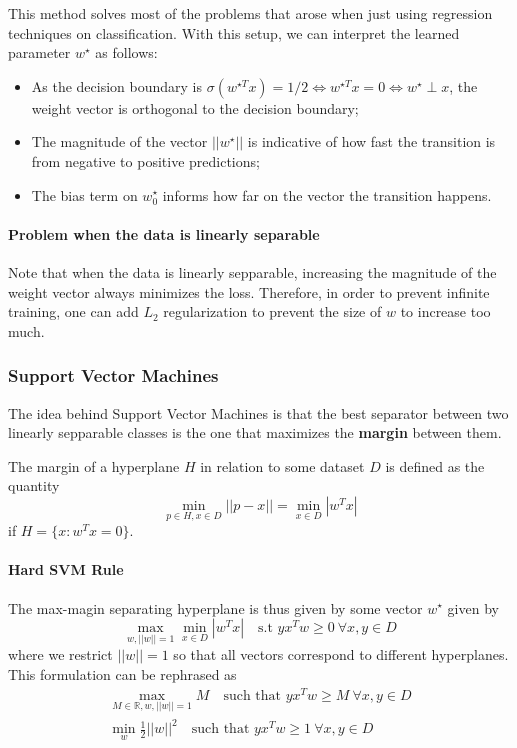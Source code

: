 \documentclass{article}
\newcommand{\R}{\mathbb{R}}
\begin{document}
This method solves most of the problems that arose when just using regression techniques on classification.
With this setup, we can interpret the learned parameter $w^\star$ as follows:
\begin{itemize}
    \item As the decision boundary is $\sigma(w^{\star T} x) = 1/2 \Leftrightarrow w^{\star T} x = 0 \Leftrightarrow w^\star \perp x$, the weight vector is orthogonal to the decision boundary;
    \item The magnitude of the vector $||w^\star||$ is indicative of how fast the transition is from negative to positive predictions;
    \item The bias term on $w^\star_0$ informs how far on the vector the transition happens.
\end{itemize}

\paragraph{Problem when the data is linearly separable}

Note that when the data is linearly sepparable, increasing the magnitude of the weight vector always minimizes the loss.
Therefore, in order to prevent infinite training, one can add $L_2$ regularization to prevent the size of $w$ to increase too much.

\subsubsection{Support Vector Machines}

The idea behind Support Vector Machines is that the best separator between two linearly sepparable classes is the one that maximizes the \textbf{margin} between them.

The margin of a hyperplane $H$ in relation to some dataset $D$ is defined as the quantity
$$
\min_{p \in H, x \in D} ||p-x|| = \min_{x \in D} |w^T x|
$$
if $H = \{ x : w^T x = 0 \}$.

\paragraph{Hard SVM Rule}

The max-magin separating hyperplane is thus given by some vector $w^\star$ given by
$$
\max_{w, ||w||=1} \min_{x \in D} |w^T x| \quad \text{s.t } y x^T w \geq 0 \ \forall x, y \in D
$$
where we restrict $||w||=1$ so that all vectors correspond to different hyperplanes.
This formulation can be rephrased as
\begin{gather*}
\max_{M \in \R, w, ||w||=1} M \quad \text{such that } y x^T w \geq M \ \forall x, y \in D \\
    \min_w \frac{1}{2}||w||^2 \quad \text{such that } y x^T w \geq 1 \ \forall x, y \in D
\end{gather*}
\end{document}

